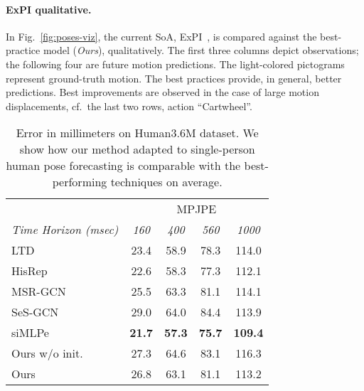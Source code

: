 \documentclass[10pt,twocolumn,letterpaper]{article}
\begin{document}
\vspace{-.3cm}
\paragraph{ExPI qualitative.}
In Fig.~\ref{fig:poses-viz}, the current SoA, ExPI~\cite{guo21}, is compared against the best-practice model (\emph{Ours}), qualitatively. The first three columns depict observations; the following four are future motion predictions.
The light-colored pictograms represent ground-truth motion.
The best practices provide, in general, better predictions. Best improvements are observed in the case of large motion displacements, cf.\ the last two rows, action ``Cartwheel''.

\begin{table}[!h]
\centering

\begin{tabular}{lcccc}
\hline
                                          & \multicolumn{4}{c}{MPJPE }                                                       \\ \cline{2-5}
\multicolumn{1}{l}{\textit{Time Horizon (msec)}} & {\textit{160}} & {\textit{400}} & {\textit{560}} & {\textit{1000}} \\ \hline \hline
\multicolumn{1}{l|}{LTD~\cite{mao19ltd}}                 & 23.4               & 58.9               & 78.3               & 114.0               \\
\multicolumn{1}{l|}{HisRep~\cite{mao20his}}              & 22.6                 & 58.3               & 77.3               & 112.1               \\
\multicolumn{1}{l|}{MSR-GCN~\cite{Dang21}}             & 25.5               & 63.3               & 81.1               & 114.1               \\
\multicolumn{1}{l|}{SeS-GCN ~\cite{sampieri22}}             & 29.0           & 64.0               & 84.4               & 113.9               \\
\multicolumn{1}{l|}{siMLPe~\cite{guo2022back}}             & \textbf{21.7}               & \textbf{57.3}               & \textbf{75.7}               & \textbf{109.4}               \\ \hline
\multicolumn{1}{l|}{Ours w/o init.}  & 27.3              & 64.6               & 83.1               & 116.3               \\ 
\multicolumn{1}{l|}{Ours}  & 26.8               & 63.1               & 81.1               & 113.2               \\ \hline
\end{tabular}
\caption{Error in millimeters on Human3.6M dataset. We show how our method adapted to single-person human pose forecasting is comparable with the best-performing techniques on average.}
\label{tab:h36m}
\end{table}
\end{document}
